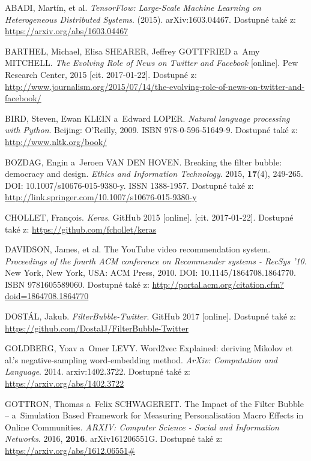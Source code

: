 \documentclass[12pt, a4paper]{article}
\numberwithin{equation}{section} 	%
\begin{document}
\newpage
\begin{thebibliography}{99}

    ABADI, Martín, et al. \textit{TensorFlow: Large-Scale Machine Learning on Heterogeneous Distributed Systems}. (2015). arXiv:1603.04467. Dostupné také z: \url{https://arxiv.org/abs/1603.04467}

    BARTHEL, Michael, Elisa SHEARER, Jeffrey GOTTFRIED a~Amy MITCHELL. \textit{The Evolving Role of News on Twitter and Facebook} [online]. Pew Research Center, 2015 [cit. 2017-01-22]. Dostupné z: \url{http://www.journalism.org/2015/07/14/the-evolving-role-of-news-on-twitter-and-facebook/}

    BIRD, Steven, Ewan KLEIN a~Edward LOPER. \textit{Natural language processing with Python}. Beijing: O'Reilly, 2009. ISBN 978-0-596-51649-9. Dostupné také z: \url{http://www.nltk.org/book/}

    BOZDAG, Engin a~Jeroen VAN DEN HOVEN. Breaking the filter bubble: democracy and design. \textit{Ethics and Information Technology}. 2015, \textbf{17}(4), 249-265. DOI: 10.1007/s10676-015-9380-y. ISSN 1388-1957. Dostupné také z: \url{http://link.springer.com/10.1007/s10676-015-9380-y}

    CHOLLET, Fran\c{c}ois. \textit{Keras}. GitHub 2015 [online]. [cit. 2017-01-22]. Dostupné také z: \url{https://github.com/fchollet/keras}

    DAVIDSON, James, et al. The YouTube video recommendation system. \textit{Proceedings of the fourth ACM conference on Recommender systems - RecSys '10}. New York, New York, USA: ACM Press, 2010. DOI: 10.1145/1864708.1864770. ISBN 9781605589060. Dostupné také z: \url{http://portal.acm.org/citation.cfm?doid=1864708.1864770}

    DOSTÁL, Jakub. \textit{FilterBubble-Twitter}. GitHub 2017 [online]. Dostupné také z: \url{https://github.com/DostalJ/FilterBubble-Twitter}

    GOLDBERG, Yoav a~Omer LEVY. Word2vec Explained: deriving Mikolov et al.'s negative-sampling word-embedding method. \textit{ArXiv: Computation and Language}. 2014. arxiv:1402.3722. Dostupné také z: \url{https://arxiv.org/abs/1402.3722}

    GOTTRON, Thomas a~Felix SCHWAGEREIT. The Impact of the Filter Bubble -- a~Simulation Based Framework for Measuring Personalisation Macro Effects in Online Communities. \textit{ARXIV: Computer Science - Social and Information Networks}. 2016, \textbf{2016}. arXiv161206551G. Dostupné také z: \url{https://arxiv.org/abs/1612.06551\#}


\end{thebibliography}
\end{document}
